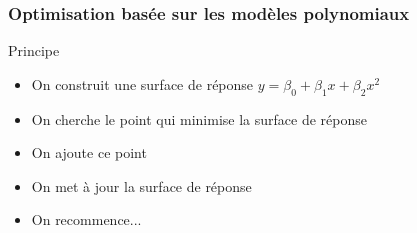 \documentclass{beamer}
\begin{document}
\begin{frame}
\frametitle{Optimisation basée sur les modèles polynomiaux}
\begin{block}{Principe}
 \begin{itemize}
  \item On construit une surface de réponse $y = \beta_0 + \beta_1 x + \beta_2 x^2$
  \item On cherche le point qui minimise la surface de réponse
  \item On ajoute ce point
  \item On met à jour la surface de réponse
  \item On recommence...
 \end{itemize}
\end{block}


\end{frame}
\end{document}
